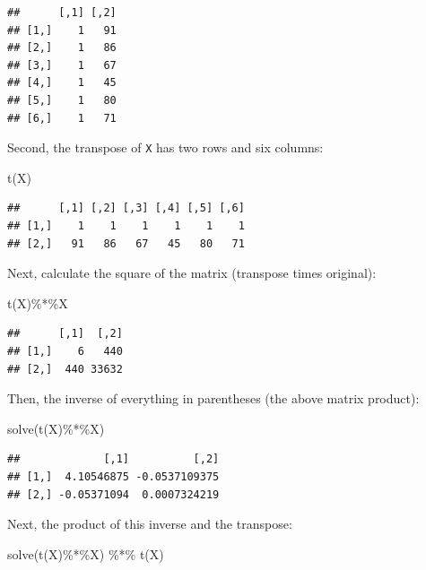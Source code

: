 \documentclass[
]{book}
\newenvironment{Shaded}{\begin{snugshade}}{\end{snugshade}}
\newcommand{\FunctionTok}[1]{\textcolor[rgb]{0.00,0.00,0.00}{#1}}
\newcommand{\NormalTok}[1]{#1}
\newcommand{\SpecialCharTok}[1]{\textcolor[rgb]{0.00,0.00,0.00}{#1}}
\begin{document}
\begin{verbatim}
##      [,1] [,2]
## [1,]    1   91
## [2,]    1   86
## [3,]    1   67
## [4,]    1   45
## [5,]    1   80
## [6,]    1   71
\end{verbatim}

Second, the transpose of \texttt{X} has two rows and six columns:

\begin{Shaded}
\begin{Highlighting}[]
\FunctionTok{t}\NormalTok{(X)}
\end{Highlighting}
\end{Shaded}

\begin{verbatim}
##      [,1] [,2] [,3] [,4] [,5] [,6]
## [1,]    1    1    1    1    1    1
## [2,]   91   86   67   45   80   71
\end{verbatim}

Next, calculate the square of the matrix (transpose times original):

\begin{Shaded}
\begin{Highlighting}[]
\FunctionTok{t}\NormalTok{(X)}\SpecialCharTok{\%*\%}\NormalTok{X}
\end{Highlighting}
\end{Shaded}

\begin{verbatim}
##      [,1]  [,2]
## [1,]    6   440
## [2,]  440 33632
\end{verbatim}

Then, the inverse of everything in parentheses (the above matrix product):

\begin{Shaded}
\begin{Highlighting}[]
\FunctionTok{solve}\NormalTok{(}\FunctionTok{t}\NormalTok{(X)}\SpecialCharTok{\%*\%}\NormalTok{X)}
\end{Highlighting}
\end{Shaded}

\begin{verbatim}
##             [,1]          [,2]
## [1,]  4.10546875 -0.0537109375
## [2,] -0.05371094  0.0007324219
\end{verbatim}

Next, the product of this inverse and the transpose:

\begin{Shaded}
\begin{Highlighting}[]
\FunctionTok{solve}\NormalTok{(}\FunctionTok{t}\NormalTok{(X)}\SpecialCharTok{\%*\%}\NormalTok{X) }\SpecialCharTok{\%*\%} \FunctionTok{t}\NormalTok{(X)}
\end{Highlighting}
\end{Shaded}
\end{document}
